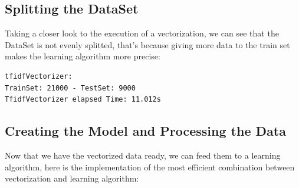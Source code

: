 \documentclass{article}
\begin{document}
\subsection{Splitting the DataSet}
Taking a closer look to the execution of a vectorization, we can see that the DataSet is not evenly splitted, that's because giving more data to the train set makes the learning algorithm more precise:

\begin{verbatim}
tfidfVectorizer:
TrainSet: 21000 - TestSet: 9000
TfidfVectorizer elapsed Time: 11.012s
\end{verbatim}

\subsection{Creating the Model and Processing the Data}
Now that we have the vectorized data ready, we can feed them to a learning algorithm, here is the implementation of the most efficient combination between vectorization and learning algorithm:\\
\end{document}
